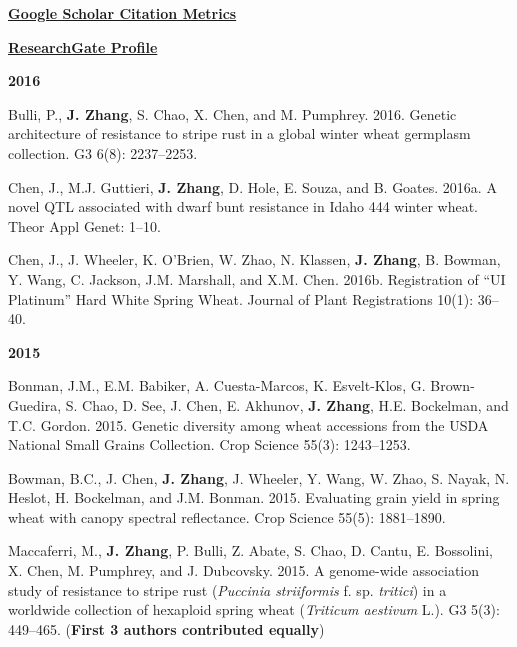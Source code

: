 

{
\fontsize{11pt}{1em}\bodyfont\bfseries\aiGoogleScholarSquare\space
\fontsize{11pt}{1em}\bodyfont\bfseries\color{blue}
\href{https://scholar.google.com.au/citations?user=0ZZ8xGYAAAAJ&hl=en}{Google Scholar Citation Metrics}
}

{
\fontsize{11pt}{1em}\bodyfont\bfseries\aiResearchGateSquare\space
\fontsize{11pt}{1em}\bodyfont\bfseries\color{blue}
\href{https://www.researchgate.net/profile/Junli_Zhang6}{ResearchGate Profile}
}

\begin{cventries}

\cventry
{\textbf{2016}}
{}
{}
{}
{
\begin{cvitems}
\setlength\itemsep{0.5em}
	\item {Bulli, P., \textbf{J. Zhang}, S. Chao, X. Chen, and M. Pumphrey. 2016. Genetic architecture of resistance to stripe rust in a global winter wheat germplasm collection. G3 6(8): 2237–2253.}
	\item {Chen, J., M.J. Guttieri, \textbf{J. Zhang}, D. Hole, E. Souza, and B. Goates. 2016a. A novel QTL associated with dwarf bunt resistance in Idaho 444 winter wheat. Theor Appl Genet: 1–10.}
	\item {Chen, J., J. Wheeler, K. O’Brien, W. Zhao, N. Klassen, \textbf{J. Zhang}, B. Bowman, Y. Wang, C. Jackson, J.M. Marshall, and X.M. Chen. 2016b. Registration of “UI Platinum” Hard White Spring Wheat. Journal of Plant Registrations 10(1): 36–40.}
\end{cvitems}
}
\cventry
{\textbf{2015}}
{}
{}
{}
{
\begin{cvitems}
\setlength\itemsep{0.5em}
	\item {Bonman, J.M., E.M. Babiker, A. Cuesta-Marcos, K. Esvelt-Klos, G. Brown-Guedira, S. Chao, D. See, J. Chen, E. Akhunov, \textbf{J. Zhang}, H.E. Bockelman, and T.C. Gordon. 2015. Genetic diversity among wheat accessions from the USDA National Small Grains Collection. Crop Science 55(3): 1243–1253.}
	\item {Bowman, B.C., J. Chen, \textbf{J. Zhang}, J. Wheeler, Y. Wang, W. Zhao, S. Nayak, N. Heslot, H. Bockelman, and J.M. Bonman. 2015. Evaluating grain yield in spring wheat with canopy spectral reflectance. Crop Science 55(5): 1881–1890.}
	\item {Maccaferri, M., \textbf{J. Zhang}, P. Bulli, Z. Abate, S. Chao, D. Cantu, E. Bossolini, X. Chen, M. Pumphrey, and J. Dubcovsky. 2015. A genome-wide association study of resistance to stripe rust (\emph{Puccinia striiformis} f. sp. \emph{tritici}) in a worldwide collection of hexaploid spring wheat (\emph{Triticum aestivum} L.). G3 5(3): 449–465. (\textbf{First 3 authors contributed equally})}

\end{cvitems}}
\end{cventries}
